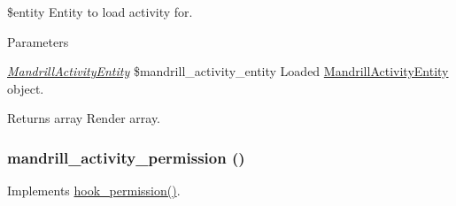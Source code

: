 \$entity Entity to load activity for.


\begin{DoxyParams}{Parameters}
\item[{\em \hyperlink{classMandrillActivityEntity}{MandrillActivityEntity}}]\$mandrill\_\-activity\_\-entity Loaded \hyperlink{classMandrillActivityEntity}{MandrillActivityEntity} object.\end{DoxyParams}
\begin{DoxyReturn}{Returns}
array Render array. 
\end{DoxyReturn}
\hypertarget{mandrill__activity_8module_ae472153f930f2f774f26ae80f5b54eba}{
\subsubsection[{mandrill\_\-activity\_\-permission}]{\setlength{\rightskip}{0pt plus 5cm}mandrill\_\-activity\_\-permission ()}}
\label{mandrill__activity_8module_ae472153f930f2f774f26ae80f5b54eba}
Implements \hyperlink{group__hooks_ga2b22b45f4925f2478412477bae329713}{hook\_\-permission()}. 